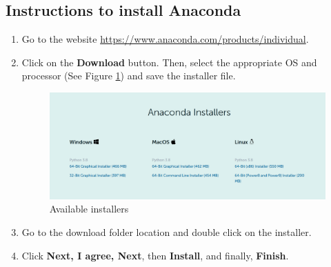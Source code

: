 \documentclass[11pt]{article}
\begin{document}
	\subsection*{Instructions to install Anaconda}
	\begin{enumerate}
		\item Go to the website \href{https://www.anaconda.com/products/individual}{https://www.anaconda.com/products/individual}.
		\item Click on the \textbf{Download} button. Then, select the appropriate OS and processor (See Figure \ref{fig:install}) and save the installer file. 
		
		\begin{figure}[h!]
			\centering
			\includegraphics[width=1\linewidth]{Fig/down.png}
			\caption{Available installers}
			\label{fig:install}
		\end{figure}
		\item Go to the download folder location and double click on the installer.
		\item Click \textbf{ Next, I agree, Next}, then \textbf{Install}, and finally, \textbf{Finish}. 


\end{enumerate}
\end{document}
